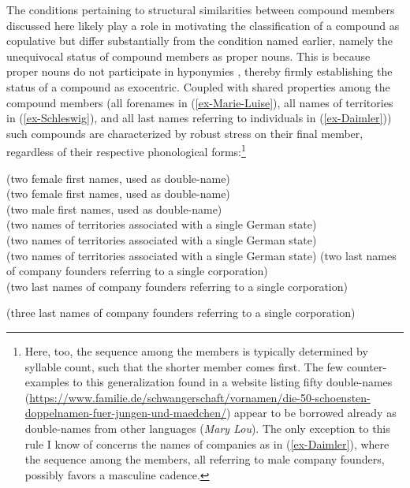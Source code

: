 \documentclass[output=paper
 ,nobabel
 ,draftmode
 ,colorlinks, citecolor=brown
]{langscibook}
\begin{document}
The conditions pertaining to structural similarities between compound members discussed here likely play a role in motivating the classification of a compound as copulative but differ substantially from the condition named earlier, namely the unequivocal status of compound members as proper nouns. This is because proper nouns do not participate in hyponymies , thereby firmly establishing the status of a compound as exocentric. Coupled with shared properties among the compound members (\eg all forenames in (\ref{ex-Marie-Luise}), all names of territories in (\ref{ex-Schleswig}), and all last names referring to individuals in (\ref{ex-Daimler})) such compounds 
are characterized by robust stress on their final member, regardless of their respective phonological forms:\footnote{Here, too, the sequence among the members is typically determined by syllable count, such that the shorter member comes first. The few counter-examples to this generalization found in a website listing fifty double-names  (\url{https://www.familie.de/schwangerschaft/vornamen/die-50-schoensten-doppelnamen-fuer-jungen-und-maedchen/}) appear to be borrowed already as double-names from other languages (\eg \emph{Mary Lou}). The only exception to this rule I know of concerns the names of  companies as in (\ref{ex-Daimler}), where the sequence among the members, all referring to male company founders, possibly favors a masculine cadence.} 

\eal\label{ex-Marie-Klöckner}
\ex\label{ex-Marie-Luise}
 (two female first names, used as double-name) \\ 
 (two female first names, used as double-name) \\ 
 (two male first names, used as double-name) \\
\ex\label{ex-Schleswig}
 (two names of territories associated with a single German state) \\ 
 (two names of territories associated with a single German state)\\
 (two names of territories associated with a single German state)
\ex\label{ex-Daimler}
 (two last names of company founders referring to a single corporation) \\
 (two last names of company founders referring to a single corporation)

 (three last names of company founders referring to a single corporation)
\\
\end{document}
